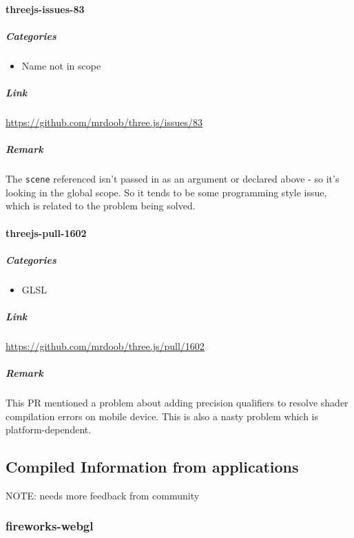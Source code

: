 \documentclass[]{article}
\begin{document}
\paragraph{threejs-issues-83}\label{threejs-issues-83}

\subparagraph{Categories}\label{categories-14}

\begin{itemize}
\itemsep1pt\parskip0pt
\item
  Name not in scope
\end{itemize}

\subparagraph{Link}\label{link-14}

\url{https://github.com/mrdoob/three.js/issues/83}

\subparagraph{Remark}\label{remark-14}

The \texttt{scene} referenced isn't passed in as an argument or declared
above - so it's looking in the global scope. So it tends to be some
programming style issue, which is related to the problem being solved.

\paragraph{threejs-pull-1602}\label{threejs-pull-1602-1}

\subparagraph{Categories}\label{categories-15}

\begin{itemize}
\itemsep1pt\parskip0pt
\item
  GLSL
\end{itemize}

\subparagraph{Link}\label{link-15}

\url{https://github.com/mrdoob/three.js/pull/1602}

\subparagraph{Remark}\label{remark-15}

This PR mentioned a problem about adding precision qualifiers to resolve
shader compilation errors on mobile device. This is also a nasty problem
which is platform-dependent.


\subsection{Compiled Information from
applications}\label{compiled-information-from-applications}

NOTE: needs more feedback from community

\subsubsection{fireworks-webgl}\label{fireworks-webgl}
\end{document}
